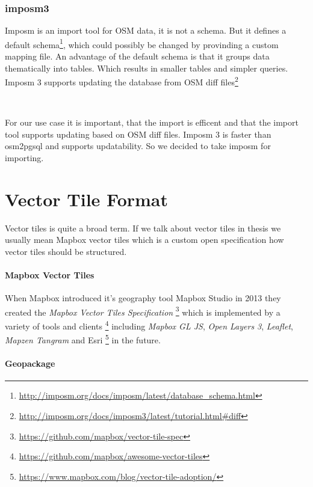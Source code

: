 \subsubsection{imposm3}\label{imposm-importer}

Imposm is an import tool for OSM data, it is not a schema. But it
defines a default
schema\footnote{\url{http://imposm.org/docs/imposm/latest/database_schema.html}},
which could possibly be changed by provinding a custom mapping file. An
advantage of the default schema is that it groups data thematically into
tables. Which results in smaller tables and simpler queries. Imposm 3
supports updating the database from OSM diff
files\footnote{\url{http://imposm.org/docs/imposm3/latest/tutorial.html\#diff}}

\\ 
\begin{tcolorbox}[arc=0mm,boxrule=1pt,title=Decision]\label{osm_import_tool_decision}
For our use case it is important, that the import is efficent and that
the import tool supports updating based on OSM diff files. Imposm 3 is
faster than osm2pgsql and supports updatability. So we decided to take
imposm for importing.
\end{tcolorbox}

\section{Vector Tile Format}\label{vector-tile-formats}

Vector tiles is quite a broad term. If we talk about vector tiles in thesis we usually mean Mapbox vector tiles which is a custom open specification how vector tiles should be structured.

\paragraph{Mapbox Vector Tiles}

When Mapbox introduced it's geography tool Mapbox Studio in 2013 they
created the \emph{Mapbox Vector Tiles Specification}
\footnote{\url{https://github.com/mapbox/vector-tile-spec}} which is
implemented by a variety of tools and clients
\footnote{\url{https://github.com/mapbox/awesome-vector-tiles}}
including \emph{Mapbox GL JS}, \emph{Open Layers 3}, \emph{Leaflet},
\emph{Mapzen Tangram} and Esri
\footnote{\url{https://www.mapbox.com/blog/vector-tile-adoption/}} in
the future.

\paragraph{Geopackage}

